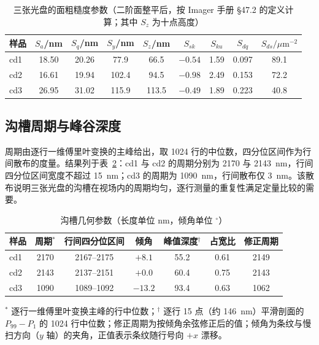\documentclass[12pt,a4paper,fontset=windows]{ctexart}
\begin{document}
\begin{table}[H]
\centering
\caption{三张光盘的面粗糙度参数（二阶面整平后，按 Imager 手册 §47.2 的定义计算；其中 $S_z$ 为十点高度）}
\label{tab:rough}
\small
{}
\begin{tabular}{@{}lcccccccc@{}}
\toprule
样品 & $S_a$/nm & $S_q$/nm & $S_y$/nm & $S_z$/nm & $S_{sk}$ & $S_{ku}$ & $S_{dq}$ & $S_{ds}/\mu\mathrm{m}^{-2}$ \\
\midrule
cd1 & 18.50 & 20.26 & 77.9 & 66.5 & $-0.54$ & 1.59 & 0.097 & 89.1 \\
cd2 & 16.61 & 19.94 & 102.4 & 94.5 & $-0.98$ & 2.49 & 0.153 & 72.2 \\
cd3 & 26.95 & 31.02 & 115.9 & 113.5 & $-0.49$ & 1.89 & 0.223 & 40.8 \\
\bottomrule
\end{tabular}
\end{table}

\subsection{沟槽周期与峰谷深度}
\label{sec:groove}

周期由逐行一维傅里叶变换的主峰给出，取 1024 行的中位数，四分位区间作为行间散布的度量。结果列于表~\ref{tab:groove}：cd1 与 cd2 的周期分别为 2170 与 2143~nm，行间四分位区间宽度不超过 15~nm；cd3 的周期为 1090~nm，行间散布仅 3~nm。该散布说明三张光盘的沟槽在视场内的周期均匀，逐行测量的重复性满足定量比较的需要。

\begin{table}[H]
\centering
\caption{沟槽几何参数（长度单位 nm，倾角单位 $^\circ$）}
\label{tab:groove}
\small
{}
\begin{tabular}{@{}lcccccc@{}}
\toprule
样品 & 周期$^\ast$ & 行间四分位区间 & 倾角 & 峰值深度$^\dagger$ & 占宽比 & 修正周期 \\
\midrule
cd1 & 2170 & 2167--2175 & $+8.1$ & 55.2 & 0.61 & 2149 \\
cd2 & 2143 & 2137--2151 & $+0.0$ & 60.4 & 0.75 & 2143 \\
cd3 & 1090 & 1089--1092 & $-13.2$ & 93.4 & 0.63 & 1062 \\
\bottomrule
\end{tabular}

\vspace{2pt}
\footnotesize $^\ast$ 逐行一维傅里叶变换主峰的行中位数；$^\dagger$ 逐行 15 点（约 146~nm）平滑剖面的 $P_{99}-P_1$ 的 1024 行中位数；修正周期为按倾角余弦修正后的值；倾角为条纹与慢扫方向（$y$ 轴）的夹角，正值表示条纹随行号向 $+x$ 漂移。
\end{table}
\end{document}
